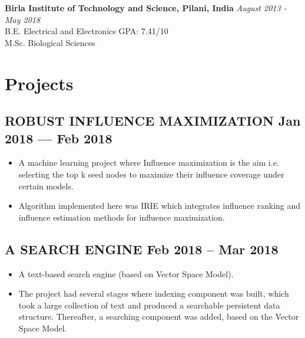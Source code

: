 \documentclass[a4,10pt]{article}
\newenvironment{zitemize}{
\begin{itemize}\itemsep0pt \parskip0pt \parsep1pt}
{\end{itemize}\vspace{-0.5cm}}
\begin{document}
{\bf Birla Institute of Technology and Science, Pilani, India} \hfill {\em August 2013 - May 2018} 
\\ B.E. Electrical and Electronics \hfill { GPA: 7.41/10}
\\ M.Sc. Biological Sciences


\section{Projects} %



\subsection*{ROBUST INFLUENCE MAXIMIZATION \hfill Jan 2018 --- Feb 2018} 
    \begin{zitemize}
        \item A machine learning project where Influence maximization is the aim i.e. selecting the top k seed nodes to maximize their influence coverage under certain models. 
        \item Algorithm implemented here was IRIE which integrates influence ranking and influence estimation methods for influence maximization. 
    \end{zitemize}


\subsection*{A SEARCH ENGINE \hfill Feb 2018 -- Mar 2018} 
    \begin{zitemize}
        \item A text-based search engine (based on Vector Space Model). 
        \item The project had several stages where indexing component was built, which took a large collection of text and produced a searchable
        persistent data structure. Thereafter, a searching component was added, based on the Vector Space Model.
    \end{zitemize}
\end{document}
